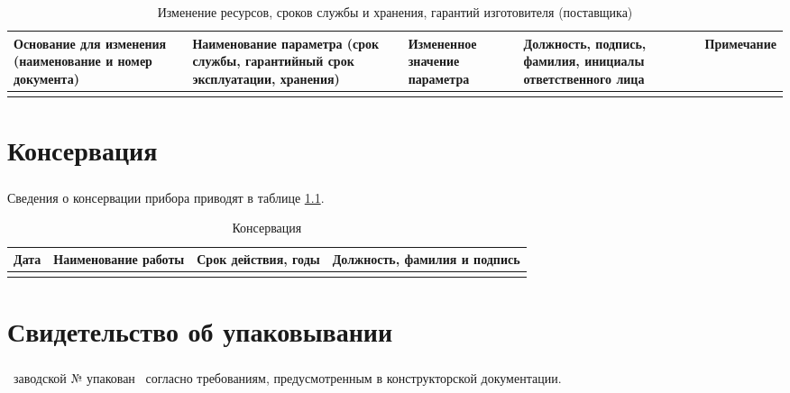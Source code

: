 	\begin{table}[H]
		\caption{\label{tab:garant} Изменение ресурсов, сроков службы и хранения, гарантий изготовителя (поставщика)}
		{\small
			\begin{tabular}{|p{3cm}|p{3cm}|p{3cm}|p{3cm}|p{3cm}|}
				\hline	
				
				Основание для изменения (наименование и номер документа)&Наименование параметра (срок службы, гарантийный срок эксплуатации, хранения) &Измененное значение параметра&Должность, подпись, фамилия, инициалы ответственного лица & Примечание\\	\hline
				\rule{0cm}{18cm}& &  & & \\	\hline
			\end{tabular}
		}
	\end{table}


\chapter{Консервация}
 
\paragraph{} Сведения о консервации прибора приводят в таблице \ref{tab:conserv}.
	
		\begin{table}[H]
		\caption{\label{tab:conserv} Консервация}
		{\small
			\begin{tabular}{|p{1.5cm}|p{6cm}|p{4cm}|p{4cm}|}
			\hline	
					
			 Дата&Наименование работы &Срок действия, годы &Должность, фамилия и подпись \\	\hline
			\rule{0cm}{20cm}& & & \\	\hline
			\end{tabular}
		}
	\end{table}

	
\chapter{Свидетельство об упаковывании}

\paragraph{} \devName\ заводской № \underline{\hspace{3cm}} упакован \orgName\ согласно требованиям, предусмотренным в конструкторской документации.
		
